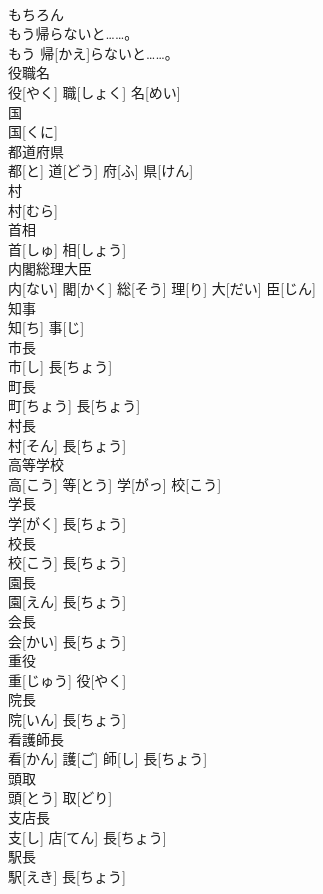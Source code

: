 \documentclass[8pt]{extreport}
\begin{document}
\begin{CJK}{UTF8}{min}
\\	もちろん		
\\	もう帰らないと……。	
\\	もう 帰[かえ]らないと……。		
\\	役職名	
\\	役[やく] 職[しょく] 名[めい]		
\\	国	
\\	国[くに]		
\\	都道府県	
\\	都[と] 道[どう] 府[ふ] 県[けん]		
\\	村	
\\	村[むら]		
\\	首相	
\\	首[しゅ] 相[しょう]		
\\	内閣総理大臣	
\\	内[ない] 閣[かく] 総[そう] 理[り] 大[だい] 臣[じん]		
\\	知事	
\\	知[ち] 事[じ]		
\\	市長	
\\	市[し] 長[ちょう]		
\\	町長	
\\	町[ちょう] 長[ちょう]		
\\	村長	
\\	村[そん] 長[ちょう]		
\\	高等学校	
\\	高[こう] 等[とう] 学[がっ] 校[こう]		
\\	学長	
\\	学[がく] 長[ちょう]		
\\	校長	
\\	校[こう] 長[ちょう]		
\\	園長	
\\	園[えん] 長[ちょう]		
\\	会長	
\\	会[かい] 長[ちょう]		
\\	重役	
\\	重[じゅう] 役[やく]		
\\	院長	
\\	院[いん] 長[ちょう]		
\\	看護師長	
\\	看[かん] 護[ご] 師[し] 長[ちょう]		
\\	頭取	
\\	頭[とう] 取[どり]		
\\	支店長	
\\	支[し] 店[てん] 長[ちょう]		
\\	駅長	
\\	駅[えき] 長[ちょう]		

\end{CJK}
\end{document}
